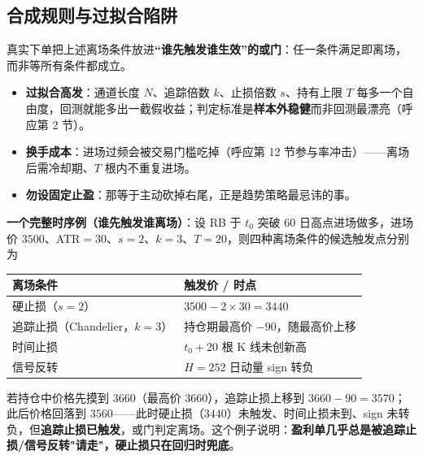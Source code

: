 \documentclass[UTF8,11pt]{ctexart}
\begin{document}
\subsection{合成规则与过拟合陷阱}
真实下单把上述离场条件放进\textbf{“谁先触发谁生效”的或门}：任一条件满足即离场，而非等所有条件都成立。
\begin{itemize}[itemsep=2pt]
\item \textbf{过拟合高发}：通道长度 $N$、追踪倍数 $k$、止损倍数 $s$、持有上限 $T$ 每多一个自由度，回测就能多出一截假收益；判定标准是\textbf{样本外稳健}而非回测最漂亮（呼应第 2 节）。
\item \textbf{换手成本}：进场过频会被交易门槛吃掉（呼应第 12 节参与率冲击）——离场后需冷却期、$T$ 根内不重复进场。
\item \textbf{勿设固定止盈}：那等于主动砍掉右尾，正是趋势策略最忌讳的事。
\end{itemize}

\textbf{一个完整时序例（谁先触发谁离场）}：设 RB 于 $t_0$ 突破 60 日高点进场做多，进场价 $3500$、ATR$=30$、$s=2$、$k=3$、$T=20$，则四种离场条件的候选触发点分别为
\begin{center}
\renewcommand{\arraystretch}{1.3}
\begin{tabular}{@{}ll@{}}
\toprule
离场条件 & 触发价 / 时点 \\
\midrule
硬止损（$s=2$） & $3500-2\times30=3440$ \\
追踪止损（Chandelier，$k=3$） & 持仓期最高价 $-90$，随最高价上移 \\
时间止损 & $t_0+20$ 根 K 线未创新高 \\
信号反转 & $H=252$ 日动量 sign 转负 \\
\bottomrule
\end{tabular}
\end{center}
若持仓中价格先摸到 $3660$（最高价 $3660$），追踪止损上移到 $3660-90=3570$；此后价格回落到 $3560$——此时硬止损（$3440$）未触发、时间止损未到、sign 未转负，但\textbf{追踪止损已触发}，或门判定离场。这个例子说明：\textbf{盈利单几乎总是被追踪止损/信号反转"请走"，硬止损只在回归时兜底}。
\end{document}
